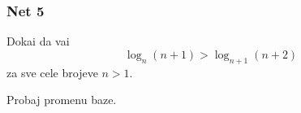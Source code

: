 \subsubsection{Net 5}
 
\zadatak 
Doka{\zv}i da va{\zv}i
$$
\log_n(n + 1) > \log_{n+1}(n+2)
$$
za sve cele brojeve $n>1$.

\resenje Probaj promenu baze.
